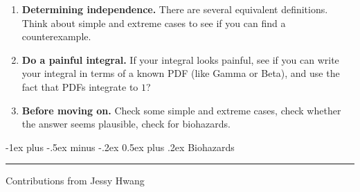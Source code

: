 \documentclass[10pt,landscape]{article}
\makeatletter
\renewcommand{\section}{\@startsection{section}{1}{0mm}%
                                {-1ex plus -.5ex minus -.2ex}%
                                {0.5ex plus .2ex}%
                                {\normalfont\large\bfseries}}
\makeatother
\begin{document}
\begin{multicols*}{3}
\begin{enumerate}
        \item \textbf{Determining independence.} There are several equivalent definitions. Think about simple and extreme cases to see if you can find a counterexample.
        
        \item \textbf{Do a painful integral.} If your integral looks painful, see if you can write your integral in terms of a known PDF (like Gamma or Beta), and use the fact that PDFs integrate to $1$?
        
        \item \textbf{Before moving on.} Check some simple and extreme cases, check whether the answer seems plausible, check for biohazards.
    \end{enumerate}
                                                      
                                                      
      \section{Biohazards} \smallskip \hrule height 2pt \smallskip
                                              
      Contributions from Jessy Hwang
                                              

\end{multicols*}
\end{document}
